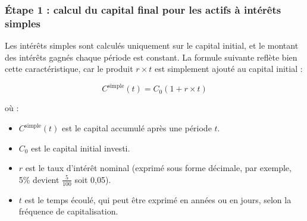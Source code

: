 \documentclass{article}
\begin{document}
\subsubsection*{Étape 1 : calcul du capital final pour les actifs à intérêts simples}

\begin{tcolorbox}[
        colback=lightgreen, 
        colframe=lightgreen, 
        boxrule=0.5pt, 
        arc=0pt, 
        left=10pt, 
        right=10pt, 
        top=6pt, 
        bottom=6pt, 
        boxsep=2pt, 
        before upper={\faLightbulb\hspace{10pt}}
    ]
        Les intérêts simples sont calculés uniquement sur le capital initial, et le montant des intérêts gagnés chaque période est constant. La formule suivante reflète bien cette caractéristique, car le produit \( r \times t \) est simplement ajouté au capital initial :

        \[
        C^{\text{simple}}(t) = C_0 \left(1 + r \times t\right)
        \]
        
        où :
        \begin{itemize}
            \item \( C^{\text{simple}}(t) \) est le capital accumulé après une période \( t \).
            \item \( C_0 \) est le capital initial investi.
            \item \( r \) est le taux d'intérêt nominal (exprimé sous forme décimale, par exemple, 5\% devient $\frac{5}{100}$ soit 0,05).
            \item \( t \) est le temps écoulé, qui peut être exprimé en années ou en jours, selon la fréquence de capitalisation.
        \end{itemize}
    \end{tcolorbox}
\end{document}
